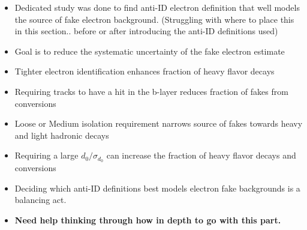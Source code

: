 \begin{itemize}
\item Dedicated study was done to find anti-ID electron definition that well models the source of fake electron background. (Struggling with where to place this in this section.. before or after introducing the anti-ID definitions used)
\item Goal is to reduce the systematic uncertainty of the fake electron estimate
\item Tighter electron identification enhances fraction of heavy flavor decays
\item Requiring tracks to have a hit in the b-layer reduces fraction of fakes from conversions
\item Loose or Medium isolation requirement narrows source of fakes towards heavy and light hadronic decays
\item Requiring a large $d_0/\sigma_{d_0}$ can increase the fraction of heavy flavor decays and conversions
\item Deciding which anti-ID definitions best models electron fake backgrounds is a balancing act.
\item \textbf{Need help thinking through how in depth to go with this part. }

\end{itemize}

